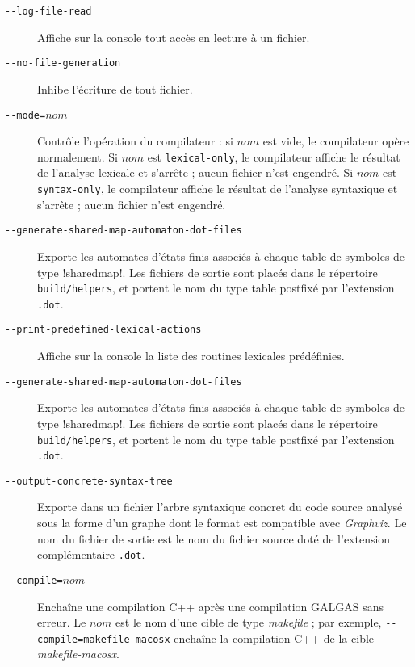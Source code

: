 

\begin{description}

  \item[\texttt{-{-}log-file-read}] Affiche sur la console tout accès en lecture à un fichier.


  \item[\texttt{-{-}no-file-generation}] Inhibe l'écriture de tout fichier.


  \item[\texttt{-{-}mode=$nom$}] Contrôle l'opération du compilateur : si $nom$ est vide, le compilateur opère normalement. Si $nom$ est \texttt{lexical-only}, le compilateur affiche le résultat de l'analyse lexicale et s'arrête ; aucun fichier n'est engendré. Si $nom$ est \texttt{syntax-only}, le compilateur affiche le résultat de l'analyse syntaxique et s'arrête ; aucun fichier n'est engendré.



  \item[\texttt{-{-}generate-shared-map-automaton-dot-files}] Exporte les automates d'états finis associés à chaque table de symboles de type \ggs!sharedmap!. Les fichiers de sortie sont placés dans le répertoire \texttt{build/helpers}, et portent le nom du type table postfixé par l'extension \texttt{.dot}.




  \item[\texttt{-{-}print-predefined-lexical-actions}] Affiche sur la console la liste des routines lexicales prédéfinies.


  \item[\texttt{-{-}generate-shared-map-automaton-dot-files}] Exporte les automates d'états finis associés à chaque table de symboles de type \ggs!sharedmap!. Les fichiers de sortie sont placés dans le répertoire \texttt{build/helpers}, et portent le nom du type table postfixé par l'extension \texttt{.dot}.





  \item[\texttt{-{-}output-concrete-syntax-tree}] Exporte dans un fichier l'arbre syntaxique concret du code source analysé sous la forme d'un graphe dont le format est compatible avec \emph{Graphviz}. Le nom du fichier de sortie est le nom du fichier source doté de l'extension complémentaire \texttt{.dot}.


  \item[\texttt{-{-}compile=$nom$}] Enchaîne une compilation C++ après une compilation GALGAS sans erreur. Le $nom$ est le nom d'une cible de type \emph{makefile} ; par exemple, \texttt{-{-}compile=makefile-macosx} enchaîne la compilation C++ de la cible \emph{makefile-macosx}.





\end{description}
